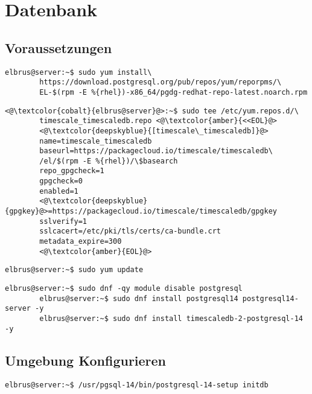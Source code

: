 \documentclass{article}
\begin{document}
	\newpage
	\section{Datenbank}
	\subsection[dependencies]{Voraussetzungen}
	\lstset{style=commands}
	\begin{lstlisting}[caption={Hinzufügen des PostgreSQL Drittanbieter-Repository, um die neuesten PostgreSQL-Pakete zu erhalten.}]
		elbrus@server:~$ sudo yum install\
		https://download.postgresql.org/pub/repos/yum/reporpms/\
		EL-$(rpm -E %{rhel})-x86_64/pgdg-redhat-repo-latest.noarch.rpm
	\end{lstlisting}

	\lstset{style=commands}
	\begin{lstlisting}[caption={Erstellen und berarbeiten des Timescale repository.},keywords={name, baseurl, repo\_gpgcheck, enabled, sslverify, sslcacert, metadata\_expire}, keywordstyle=\color{deepskyblue}]
		<@\textcolor{cobalt}{elbrus@server}@>:~$ sudo tee /etc/yum.repos.d/\ 
		timescale_timescaledb.repo <@\textcolor{amber}{<<EOL}@>
		<@\textcolor{deepskyblue}{[timescale\_timescaledb]}@>
		name=timescale_timescaledb
		baseurl=https://packagecloud.io/timescale/timescaledb\
		/el/$(rpm -E %{rhel})/\$basearch
		repo_gpgcheck=1
		gpgcheck=0
		enabled=1
		<@\textcolor{deepskyblue}{gpgkey}@>=https://packagecloud.io/timescale/timescaledb/gpgkey
		sslverify=1
		sslcacert=/etc/pki/tls/certs/ca-bundle.crt
		metadata_expire=300
		<@\textcolor{amber}{EOL}@>
	\end{lstlisting}

	\lstset{style=commands}
	\begin{lstlisting}[caption={Updaten der lokalen Package-Liste.}]
		elbrus@server:~$ sudo yum update
	\end{lstlisting}

	\begin{lstlisting}[caption={Installieren von TimescaleDB.}]
		elbrus@server:~$ sudo dnf -qy module disable postgresql
		elbrus@server:~$ sudo dnf install postgresql14 postgresql14-server -y
		elbrus@server:~$ sudo dnf install timescaledb-2-postgresql-14 -y
	\end{lstlisting}
	
	\newpage
	\subsection[TimescaleDB konfigurieren]{Umgebung Konfigurieren}
	\begin{lstlisting}[caption={Initialisieren der Datenbank.}]
		elbrus@server:~$ /usr/pgsql-14/bin/postgresql-14-setup initdb
	\end{lstlisting}
	
\end{document}
